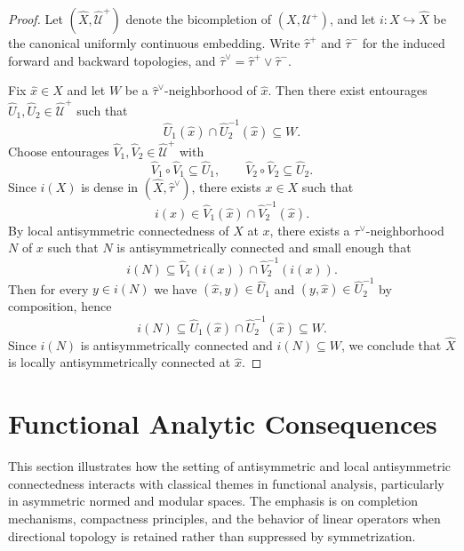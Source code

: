 \documentclass[preprint,12pt]{elsarticle}
\begin{document}
\begin{proof}
Let $(\widehat X,\widehat{\mathcal U}^{+})$ denote the bicompletion of
$(X,\mathcal U^{+})$, and let $i:X\hookrightarrow\widehat X$ be the
canonical uniformly continuous embedding. Write $\widehat\tau^{+}$ and
$\widehat\tau^{-}$ for the induced forward and backward topologies, and
$\widehat\tau^\vee=\widehat\tau^{+}\vee\widehat\tau^{-}$.

Fix $\hat x\in\widehat X$ and let $W$ be a $\widehat\tau^\vee$-neighborhood
of $\hat x$. Then there exist entourages $\widehat U_1,\widehat U_2\in
\widehat{\mathcal U}^{+}$ such that
\[
\widehat U_1(\hat x)\cap \widehat U_2^{-1}(\hat x)\subseteq W.
\]
Choose entourages $\widehat V_1,\widehat V_2\in\widehat{\mathcal U}^{+}$
with
\[
\widehat V_1\circ \widehat V_1\subseteq \widehat U_1,
\qquad
\widehat V_2\circ \widehat V_2\subseteq \widehat U_2.
\]
Since $i(X)$ is dense in $(\widehat X,\widehat\tau^\vee)$, there exists
$x\in X$ such that
\[
i(x)\in \widehat V_1(\hat x)\cap \widehat V_2^{-1}(\hat x).
\]
By local antisymmetric connectedness of $X$ at $x$, there exists a
$\tau^\vee$-neighborhood $N$ of $x$ such that $N$ is antisymmetrically
connected and small enough that
\[
i(N)\subseteq \widehat V_1(i(x))\cap \widehat V_2^{-1}(i(x)).
\]
Then for every $y\in i(N)$ we have $(\hat x,y)\in \widehat U_1$ and
$(y,\hat x)\in \widehat U_2^{-1}$ by composition, hence
\[
i(N)\subseteq \widehat U_1(\hat x)\cap \widehat U_2^{-1}(\hat x)\subseteq W.
\]
Since $i(N)$ is antisymmetrically connected and $i(N)\subseteq W$, we
conclude that $\widehat X$ is locally antisymmetrically connected at
$\hat x$.
\end{proof}


\section{Functional Analytic Consequences}
\label{sec:functional-analytic-consequences}

This section illustrates how the setting of antisymmetric and local
antisymmetric connectedness interacts with classical themes in
functional analysis, particularly in asymmetric normed and modular
spaces. The emphasis is on completion mechanisms, compactness principles,
and the behavior of linear operators when directional topology is
retained rather than suppressed by symmetrization.

\end{document}

